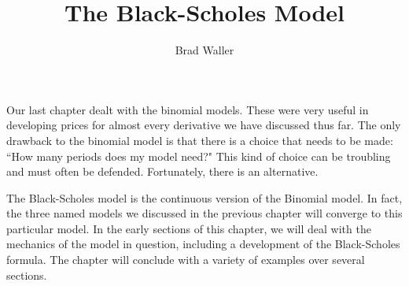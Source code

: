 \documentclass{ximera}
\title{The Black-Scholes Model}
\author{Brad Waller}
\begin{document}
\begin{abstract}
\end{abstract}
\maketitle

Our last chapter dealt with the binomial models. These were very useful in developing prices for almost every derivative we have discussed thus far. The only drawback to the binomial model is that there is a choice that needs to be made: ``How many periods does my model need?" This kind of choice can be troubling and must often be defended. Fortunately, there is an alternative.

The Black-Scholes model is the continuous version of the Binomial model. In fact, the three named models we discussed in the previous chapter will converge to this particular model. In the early sections of this chapter, we will deal with the mechanics of the model in question, including a development of the Black-Scholes formula. The chapter will conclude with a variety of examples over several sections.
\end{document}
